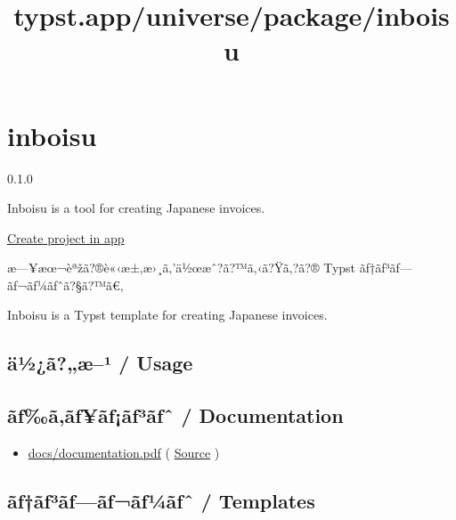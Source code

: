 \title{typst.app/universe/package/inboisu}

\label{banner}
\label{template-thumbnail}

\section{inboisu}\label{inboisu}

{ 0.1.0 }

Inboisu is a tool for creating Japanese invoices.

\href{/app?template=inboisu&version=0.1.0}{Create project in app}

\label{readme}
æ---¥æœ¬èªžã?®è«‹æ±‚æ›¸ã‚'ä½œæˆ?ã?™ã‚‹ã?Ÿã‚?ã?® Typst
ãƒ†ãƒ³ãƒ---ãƒ¬ãƒ¼ãƒˆã?§ã?™ã€‚

Inboisu is a Typst template for creating Japanese invoices.

\subsection{ä½¿ã?„æ--¹ / Usage}\label{uxe4uxbduxe3uxe6uxb9-usage}

\begin{Shaded}
\begin{Highlighting}[]

\NormalTok{)}
\end{Highlighting}
\end{Shaded}

\subsection{ãƒ‰ã‚­ãƒ¥ãƒ¡ãƒ³ãƒˆ /
Documentation}\label{uxe3ux192uxe3uxe3ux192uxe3ux192uxe3ux192uxb3uxe3ux192ux2c6-documentation}

\begin{itemize}
\tightlist
\item
  \href{https://github.com/typst/packages/raw/main/packages/preview/inboisu/0.1.0/docs/documentation.pdf}{docs/documentation.pdf}
  (
  \href{https://github.com/typst/packages/raw/main/packages/preview/inboisu/0.1.0/docs/docs.typ}{Source}
  )
\end{itemize}

\subsection{ãƒ†ãƒ³ãƒ---ãƒ¬ãƒ¼ãƒˆ /
Templates}\label{uxe3ux192uxe3ux192uxb3uxe3ux192uxe3ux192uxe3ux192uxbcuxe3ux192ux2c6-templates}

